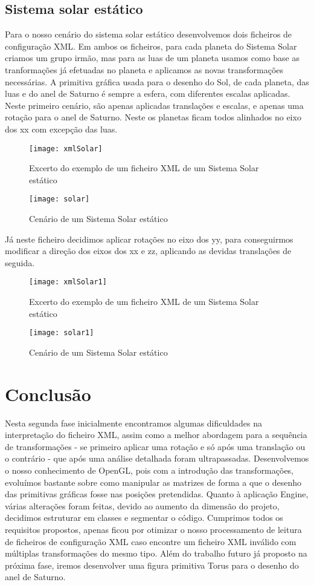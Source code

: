 \documentclass[12pt]{article}
\begin{document}
\subsection{Sistema solar estático}
Para o nosso cenário do sistema solar estático desenvolvemos dois ficheiros de configuração XML.
Em ambos os ficheiros, para cada planeta do Sistema Solar criamos um grupo irmão,
mas para as luas de um planeta usamos como base as tranformações já efetuadas no planeta e aplicamos as
novas transformações necessárias. A primitiva gráfica usada para o desenho do Sol, de cada planeta, das luas e 
do anel de Saturno é sempre a esfera, com diferentes escalas aplicadas.
Neste primeiro cenário, são apenas aplicadas translações e escalas, e apenas uma rotação para o anel de Saturno.
Neste os planetas ficam todos alinhados no eixo dos xx com excepção das luas.  
\begin{figure}[H]
\centering\texttt{[image: xmlSolar]} 
\caption{\label{fig:controller}Excerto do exemplo de um ficheiro XML de um Sistema Solar estático}
\end{figure}
\begin{figure}[H]
\centering\texttt{[image: solar]} 
\caption{\label{fig:controller}Cenário de um Sistema Solar estático}
\end{figure}
\newpage
Já neste ficheiro decidimos aplicar rotações no eixo dos yy, para conseguirmos modificar a direção dos eixos dos xx e zz, aplicando
as devidas translações de seguida.
\begin{figure}[H]
\centering\texttt{[image: xmlSolar1]} 
\caption{\label{fig:controller}Excerto do exemplo de um ficheiro XML de um Sistema Solar estático}
\end{figure}
\begin{figure}[H]
\centering\texttt{[image: solar1]} 
\caption{\label{fig:controller}Cenário de um Sistema Solar estático}
\end{figure}
\newpage
\section{Conclusão}
Nesta segunda fase inicialmente encontramos algumas dificuldades na interpretação do ficheiro XML, assim como 
a melhor abordagem para a sequência de transformações - se primeiro aplicar uma rotação e só após uma translação ou o contrário - 
que após uma análise detalhada foram ultrapassadas. Desenvolvemos
o nosso conhecimento de OpenGL, pois com a introdução das transformações, evoluímos bastante
sobre como manipular as matrizes de forma a que o desenho das primitivas gráficas fosse nas posições pretendidas. Quanto à 
aplicação Engine, várias alterações foram feitas, devido ao aumento da dimensão do projeto, decidimos estruturar em classes e segmentar o código.
Cumprimos todos os requisitos propostos, apenas ficou por otimizar o nosso processamento de leitura de ficheiros de configuração XML caso encontre 
um ficheiro XML inválido com múltiplas transformações do mesmo tipo. Além do trabalho futuro já proposto na próxima fase,
iremos desenvolver uma figura primitiva Torus para o desenho do anel de Saturno.
\end{document}
